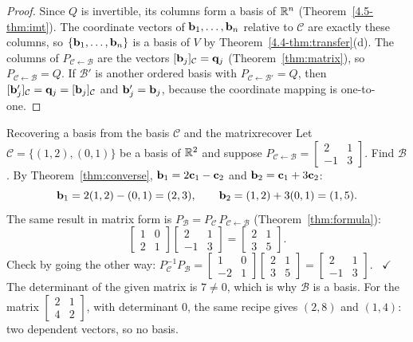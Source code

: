 \documentclass[11pt]{article}
\begin{document}
\begin{proof}
Since $Q$ is invertible, its columns form a basis of $\mathbb{R}^n$ (Theorem~\ref{4.5-thm:imt}). The coordinate vectors of $\mathbf{b}_1,\dots,\mathbf{b}_n$ relative to $\mathcal{C}$ are exactly these columns, so $\{\mathbf{b}_1,\dots,\mathbf{b}_n\}$ is a basis of $V$ by Theorem~\ref{4.4-thm:transfer}(d). The columns of $P_{\mathcal{C}\leftarrow\mathcal{B}}$ are the vectors $[\mathbf{b}_j]_{\mathcal{C}}=\mathbf{q}_j$ (Theorem~\ref{thm:matrix}), so $P_{\mathcal{C}\leftarrow\mathcal{B}}=Q$. If $\mathcal{B}'$ is another ordered basis with $P_{\mathcal{C}\leftarrow\mathcal{B}'}=Q$, then $[\mathbf{b}'_j]_{\mathcal{C}}=\mathbf{q}_j=[\mathbf{b}_j]_{\mathcal{C}}$ and $\mathbf{b}'_j=\mathbf{b}_j$, because the coordinate mapping is one-to-one.
\end{proof}

\begin{exmp}{Recovering a basis from the basis $\mathcal{C}$ and the matrix}{recover}
Let $\mathcal{C}=\{(1,2),(0,1)\}$ be a basis of $\mathbb{R}^2$ and suppose $P_{\mathcal{C}\leftarrow\mathcal{B}}=\begin{bmatrix}2&1\\-1&3\end{bmatrix}$. Find $\mathcal{B}$. By Theorem~\ref{thm:converse}, $\mathbf{b}_1=2\mathbf{c}_1-\mathbf{c}_2$ and $\mathbf{b}_2=\mathbf{c}_1+3\mathbf{c}_2$:
\[
\mathbf{b}_1=2(1,2)-(0,1)=(2,3),\qquad \mathbf{b}_2=(1,2)+3(0,1)=(1,5).
\]
The same result in matrix form is $P_{\mathcal{B}}=P_{\mathcal{C}}\,P_{\mathcal{C}\leftarrow\mathcal{B}}$ (Theorem~\ref{thm:formula}):
\[
\begin{bmatrix}1&0\\2&1\end{bmatrix}\begin{bmatrix}2&1\\-1&3\end{bmatrix}=\begin{bmatrix}2&1\\3&5\end{bmatrix}.
\]
Check by going the other way: $P_{\mathcal{C}}^{-1}P_{\mathcal{B}}=\begin{bmatrix}1&0\\-2&1\end{bmatrix}\begin{bmatrix}2&1\\3&5\end{bmatrix}=\begin{bmatrix}2&1\\-1&3\end{bmatrix}$. \ $\checkmark$ The determinant of the given matrix is $7\neq0$, which is why $\mathcal{B}$ is a basis. For the matrix $\begin{bmatrix}2&1\\4&2\end{bmatrix}$, with determinant $0$, the same recipe gives $(2,8)$ and $(1,4)$: two dependent vectors, so no basis.
\end{exmp}
\end{document}
